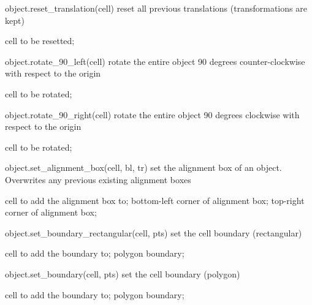 \begin{APIfunc}{object.reset\_translation(cell)}
    reset all previous translations (transformations are kept)
    \begin{APIparameters}
            cell to be resetted;
    \end{APIparameters}
\end{APIfunc}
\begin{APIfunc}{object.rotate\_90\_left(cell)}
    rotate the entire object 90 degrees counter-clockwise with respect to the origin
    \begin{APIparameters}
            cell to be rotated;
    \end{APIparameters}
\end{APIfunc}
\begin{APIfunc}{object.rotate\_90\_right(cell)}
    rotate the entire object 90 degrees clockwise with respect to the origin
    \begin{APIparameters}
            cell to be rotated;
    \end{APIparameters}
\end{APIfunc}
\begin{APIfunc}{object.set\_alignment\_box(cell, bl, tr)}
    set the alignment box of an object. Overwrites any previous existing alignment boxes
    \begin{APIparameters}
            cell to add the alignment box to;
            bottom-left corner of alignment box;
            top-right corner of alignment box;
    \end{APIparameters}
\end{APIfunc}
\begin{APIfunc}{object.set\_boundary\_rectangular(cell, pts)}
    set the cell boundary (rectangular)
    \begin{APIparameters}
            cell to add the boundary to;
            polygon boundary;
    \end{APIparameters}
\end{APIfunc}
\begin{APIfunc}{object.set\_boundary(cell, pts)}
    set the cell boundary (polygon)
    \begin{APIparameters}
            cell to add the boundary to;
            polygon boundary;
    \end{APIparameters}
\end{APIfunc}
